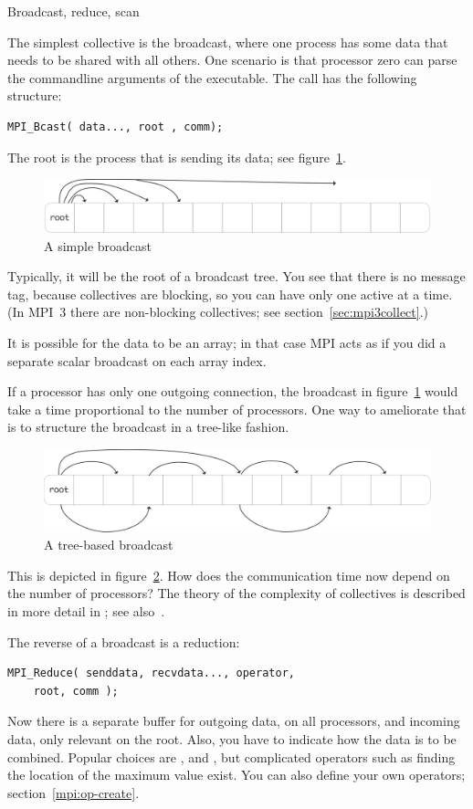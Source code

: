  {Broadcast, reduce, scan}
\label{sec:bcast}

The simplest collective is the broadcast, where one process has some
data that needs to be shared with all others. One scenario is that
processor zero can parse the commandline arguments of the executable.
The call has the following structure:
\begin{verbatim}
MPI_Bcast( data..., root , comm);
\end{verbatim}
The root is the process that is sending its data; see figure~\ref{fig:bcast-simple}.
\begin{figure}[ht]
  \includegraphics[scale=.08]{graphics-public/bcast-simple}
  \caption{A simple broadcast}
  \label{fig:bcast-simple}
\end{figure}
Typically, it will
be the root of a broadcast tree. You see that there is no message tag,
because collectives are blocking, so you can have only one active at a
time. (In MPI~3 there are non-blocking collectives; see
section~\ref{sec:mpi3collect}.)

It is possible for the data to be an array; in that case MPI acts as if you did a 
separate scalar broadcast on each array index.

If a processor has only one outgoing connection, the broadcast in
figure~\ref{fig:bcast-simple} would take a time proportional to the
number of processors. One way to ameliorate that is to structure the
broadcast in a tree-like fashion.
\begin{figure}[ht]
  \includegraphics[scale=.1]{graphics-public/bcast-tree}
  \caption{A tree-based broadcast}
  \label{fig:bcast-tree}
\end{figure}
This is depicted in figure~\ref{fig:bcast-tree}. How does the
communication time now depend on the number of processors? The theory
of the complexity of collectives is described in more detail in
; see also~\cite{Chan2007Collective}.

The reverse of a broadcast is a reduction:
\begin{verbatim}
MPI_Reduce( senddata, recvdata..., operator,
    root, comm ); 
\end{verbatim}
Now there is a separate buffer for outgoing data, on all processors,
and incoming data, only relevant on the root. Also, you have to
indicate how the data is to be combined. Popular choices are
,  and
, but complicated operators such as finding the
location of the maximum value exist. You can also define your own
operators; section~\ref{mpi:op-create}.

